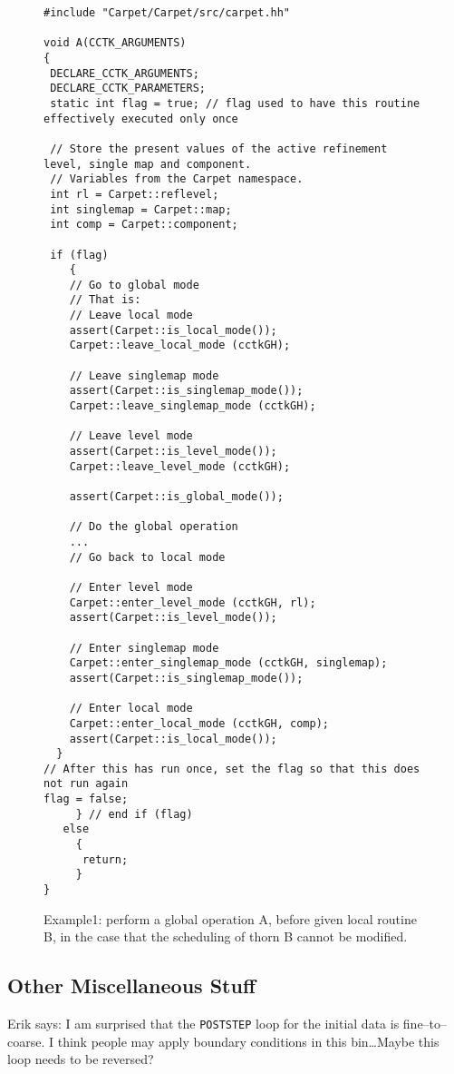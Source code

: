 \documentclass{article}
\begin{document}
\begin{figure}
\begin{verbatim}
#include "Carpet/Carpet/src/carpet.hh"

void A(CCTK_ARGUMENTS)
{
 DECLARE_CCTK_ARGUMENTS;
 DECLARE_CCTK_PARAMETERS;
 static int flag = true; // flag used to have this routine effectively executed only once

 // Store the present values of the active refinement level, single map and component.
 // Variables from the Carpet namespace.
 int rl = Carpet::reflevel;   
 int singlemap = Carpet::map;
 int comp = Carpet::component;
    
 if (flag)
    {
    // Go to global mode
    // That is:
    // Leave local mode
    assert(Carpet::is_local_mode());
    Carpet::leave_local_mode (cctkGH);

    // Leave singlemap mode
    assert(Carpet::is_singlemap_mode());
    Carpet::leave_singlemap_mode (cctkGH);	    

    // Leave level mode
    assert(Carpet::is_level_mode());
    Carpet::leave_level_mode (cctkGH);	    
		
    assert(Carpet::is_global_mode());
	    
    // Do the global operation
    ...
    // Go back to local mode
	    
    // Enter level mode
    Carpet::enter_level_mode (cctkGH, rl);
    assert(Carpet::is_level_mode());

    // Enter singlemap mode
    Carpet::enter_singlemap_mode (cctkGH, singlemap);
    assert(Carpet::is_singlemap_mode());
	    
    // Enter local mode
    Carpet::enter_local_mode (cctkGH, comp);
    assert(Carpet::is_local_mode());
  }
// After this has run once, set the flag so that this does not run again
flag = false;
     } // end if (flag)
   else
     {
      return;
     }
}
\end{verbatim}
\caption[Example1]
	{
	  Example1: perform a global operation A, before given local routine B, 
	  in the case that the scheduling of thorn B cannot be modified.
	}
\label{fig-example1}
\end{figure}


\subsection{Other Miscellaneous Stuff}

Erik says:
I am surprised that the \verb|POSTSTEP| loop for the initial data is
fine--to--coarse.  I think people may apply boundary conditions in
this bin\ldots Maybe this loop needs to be reversed?




\end{document}
